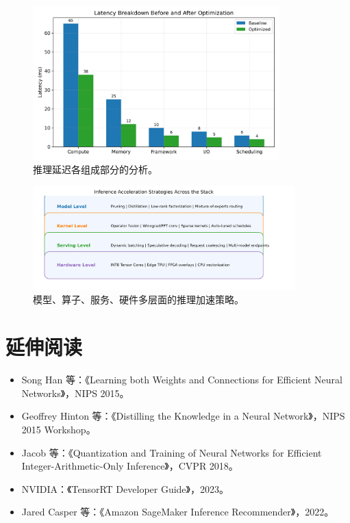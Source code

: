 \documentclass[UTF8,zihao=-4]{ctexart}
\begin{document}
\begin{figure}[H]
  \centering
  \includegraphics[width=0.85\textwidth]{latency_breakdown.png}
  \caption{推理延迟各组成部分的分析。}
  \label{fig:latency_breakdown_cn}
\end{figure}

\begin{figure}[H]
  \centering
  \includegraphics[width=0.9\textwidth]{accelerated_inference_strategies.png}
  \caption{模型、算子、服务、硬件多层面的推理加速策略。}
  \label{fig:accelerated_inference_strategies_cn}
\end{figure}
\FloatBarrier

\section*{延伸阅读}
\begin{itemize}
  \item Song Han 等：《Learning both Weights and Connections for Efficient Neural Networks》，NIPS 2015。
  \item Geoffrey Hinton 等：《Distilling the Knowledge in a Neural Network》，NIPS 2015 Workshop。
  \item Jacob 等：《Quantization and Training of Neural Networks for Efficient Integer-Arithmetic-Only Inference》，CVPR 2018。
  \item NVIDIA：《TensorRT Developer Guide》，2023。
  \item Jared Casper 等：《Amazon SageMaker Inference Recommender》，2022。
\end{itemize}
\end{document}
